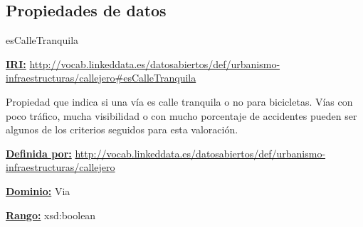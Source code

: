 \subsection{Propiedades de datos}




\begin{mybox}{esCalleTranquila}
\begin{flushleft}
\underline{\textbf{IRI:}}
\url{http://vocab.linkeddata.es/datosabiertos/def/urbanismo-infraestructuras/callejero#esCalleTranquila}
\newline

Propiedad que indica si una vía es calle tranquila o no para bicicletas. Vías con poco tráfico, mucha visibilidad o con mucho porcentaje de accidentes pueden ser algunos de los criterios seguidos para esta valoración.
\newline


\underline{\textbf{Definida por:}}\newline
\url{http://vocab.linkeddata.es/datosabiertos/def/urbanismo-infraestructuras/callejero}
\newline

\underline{\textbf{Dominio:}}
	Via
\newline

\underline{\textbf{Rango:}}
		xsd:boolean

\end{flushleft}
\end{mybox}





